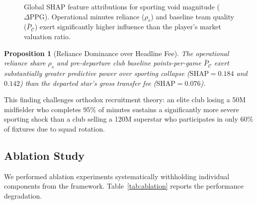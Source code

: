 \documentclass[10pt,journal,compsoc]{IEEEtran}
\newtheorem{proposition}{Proposition}
\begin{document}
\begin{figure}[htbp]
\centering
{}
\caption{Global SHAP feature attributions for sporting void magnitude ($\Delta\text{PPG}$). Operational minutes reliance ($\rho_s$) and baseline team quality ($\bar{P}_{\mathcal{C}}$) exert significantly higher influence than the player's market valuation ratio.}
\label{fig:shap}
\end{figure}

\begin{proposition}[Reliance Dominance over Headline Fee]
The operational reliance share $\rho_s$ and pre-departure club baseline points-per-game $\bar{P}_{\mathcal{C}}$ exert substantially greater predictive power over sporting collapse ($\text{SHAP} = 0.184$ and $0.142$) than the departed star's gross transfer fee ($\text{SHAP} = 0.076$).
\end{proposition}
This finding challenges orthodox recruitment theory: an elite club losing a \texteuro50M midfielder who completes $95\%$ of minutes sustains a significantly more severe sporting shock than a club selling a \texteuro120M superstar who participates in only $60\%$ of fixtures due to squad rotation.

\subsection{Ablation Study}
We performed ablation experiments systematically withholding individual components from the framework. Table~\ref{tab:ablation} reports the performance degradation.
\end{document}
